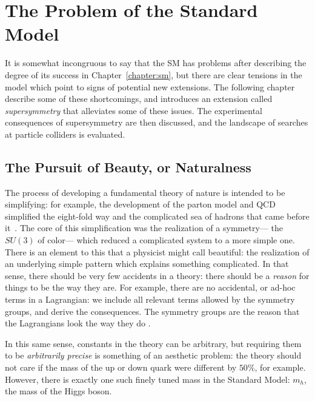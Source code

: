 \label{chapter:susy}

\section{The Problem of the Standard Model}
\label{chapter:susy:problems}

It is somewhat incongruous to say that the SM has problems after describing the degree of its success in Chapter~\ref{chapter:sm}, but there are clear tensions in the model which point to signs of potential new extensions. The following chapter describe some of these shortcomings, and introduces an extension called \textit{supersymmetry} that alleviates some of these issues\cite{Miyazawa:1966,Ramond:1971gb,Golfand:1971iw,Neveu:1971rx,Neveu:1971iv,Gervais:1971ji,Volkov:1973ix,Wess:1973kz,Wess:1974tw}. The experimental consequences of supersymmetry are then discussed, and the landscape of searches at particle colliders is evaluated.

\subsection{The Pursuit of Beauty, or Naturalness}
\label{chapter:susy:problems:naturalness}
The process of developing a fundamental theory of nature is intended to be simplifying: for example, the development of the parton model and QCD simplified the eight-fold way and the complicated sea of hadrons  that came before it~\cite{Politzer:1973fx,Gross:1973ju,Gross:1973id}. The core of this simplification was the realization of a symmetry--- the $SU(3)$ of color--- which reduced a complicated system to a more simple one. There is an element to this that a physicist might call beautiful: the realization of an underlying simple pattern which explains something complicated. In that sense, there should be very few accidents in a theory: there should be a \textit{reason} for things to be the way they are. For example, there are no accidental, or ad-hoc terms in a Lagrangian: we include all relevant terms allowed by the symmetry groups, and derive the consequences. The symmetry groups are the reason that the Lagrangians look the way they do \cite{schwartz}.

In this same sense, constants in the theory can be arbitrary, but requiring them to be \textit{arbitrarily precise} is something of an aesthetic problem: the theory should not care if the mass of the up or down quark were different by $50\%$, for example. However, there is exactly one such finely tuned mass in the Standard Model: $m_h$, the mass of the Higgs boson. 

